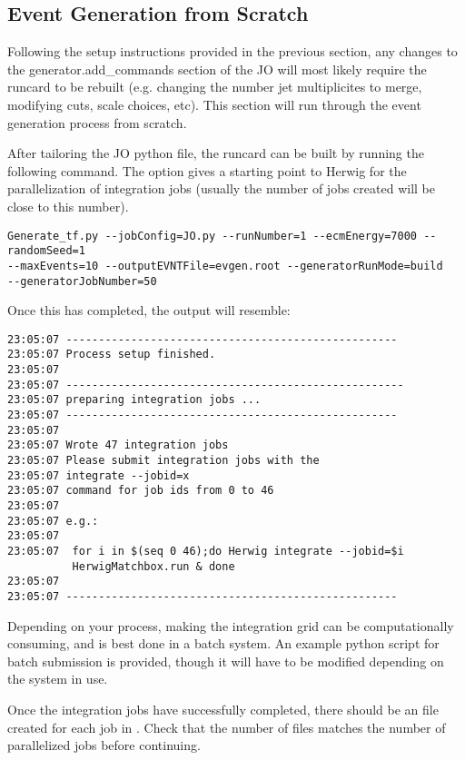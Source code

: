 \subsection{Event Generation from Scratch}

Following the setup instructions provided in the previous section, any changes to the generator.add\_commands section of the JO will most likely require the runcard to be rebuilt (e.g. changing the number jet multiplicites to merge, modifying cuts, scale choices, etc). This section will run through the event generation process from scratch.

After tailoring the JO python file, the runcard can be built by running the following command. The  option gives a starting point to Herwig for the parallelization of integration jobs (usually the number of jobs created will be close to this number). 

\begin{verbatim}
Generate_tf.py --jobConfig=JO.py --runNumber=1 --ecmEnergy=7000 --randomSeed=1 
--maxEvents=10 --outputEVNTFile=evgen.root --generatorRunMode=build 
--generatorJobNumber=50
\end{verbatim}

\noindent Once this has completed, the output will resemble:

\begin{verbatim}
23:05:07 ---------------------------------------------------
23:05:07 Process setup finished.
23:05:07 
23:05:07 ----------------------------------------------------
23:05:07 preparing integration jobs ...
23:05:07 ---------------------------------------------------
23:05:07 
23:05:07 Wrote 47 integration jobs
23:05:07 Please submit integration jobs with the
23:05:07 integrate --jobid=x
23:05:07 command for job ids from 0 to 46
23:05:07 
23:05:07 e.g.:
23:05:07 
23:05:07  for i in $(seq 0 46);do Herwig integrate --jobid=$i 
          HerwigMatchbox.run & done
23:05:07 
23:05:07 ---------------------------------------------------
\end{verbatim}

Depending on your process, making the integration grid can be computationally consuming, and is best done in a batch system. An example python script for batch submission is provided, though it will have to be modified depending on the system in use. 

Once the integration jobs have successfully completed, there should be an  file created for each job in . Check that the number of  files matches the number of parallelized jobs before continuing. 

